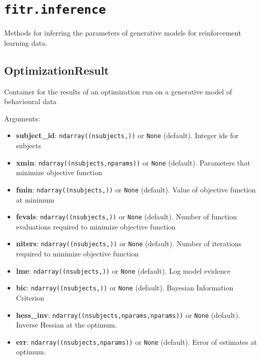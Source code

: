 \section{\texorpdfstring{\texttt{fitr.inference}}{fitr.inference}}\label{fitr.inference}

Methods for inferring the parameters of generative models for
reinforcement learning data.

\subsection{OptimizationResult}\label{optimizationresult}

\begin{Shaded}
\begin{Highlighting}[]
\end{Highlighting}
\end{Shaded}

Container for the results of an optimization run on a generative model
of behavioural data

Arguments:

\begin{itemize}
\tightlist
\item
  \textbf{subject\_id}: \texttt{ndarray((nsubjects,))} or \texttt{None}
  (default). Integer ids for subjects
\item
  \textbf{xmin}: \texttt{ndarray((nsubjects,nparams))} or \texttt{None}
  (default). Parameters that minimize objective function
\item
  \textbf{fmin}: \texttt{ndarray((nsubjects,))} or \texttt{None}
  (default). Value of objective function at minimum
\item
  \textbf{fevals}: \texttt{ndarray((nsubjects,))} or \texttt{None}
  (default). Number of function evaluations required to minimize
  objective function
\item
  \textbf{niters}: \texttt{ndarray((nsubjects,))} or \texttt{None}
  (default). Number of iterations required to minimize objective
  function
\item
  \textbf{lme}: \texttt{ndarray((nsubjects,))} or \texttt{None}
  (default). Log model evidence
\item
  \textbf{bic}: \texttt{ndarray((nsubjects,))} or \texttt{None}
  (default). Bayesian Information Criterion
\item
  \textbf{hess\_inv}: \texttt{ndarray((nsubjects,nparams,nparams))} or
  \texttt{None} (default). Inverse Hessian at the optimum.
\item
  \textbf{err}: \texttt{ndarray((nsubjects,nparams))} or \texttt{None}
  (default). Error of estimates at optimum.
\end{itemize}

